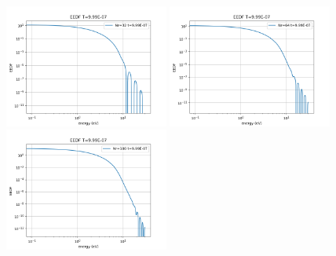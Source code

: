 \documentclass[mathserif, aspectratio=169]{beamer}
\begin{document}
\begin{frame}
\begin{figure}
{				\includegraphics[width=0.48\textwidth]{g0_mw_nr32_eedf.png}
			}
			\only<+>
			{
				\includegraphics[width=0.48\textwidth]{g0_mw_nr64_eedf.png}
				\includegraphics[width=0.48\textwidth]{g0_mw_nr100_eedf.png}
			}
		\end{figure}
	\end{frame}
\end{document}
